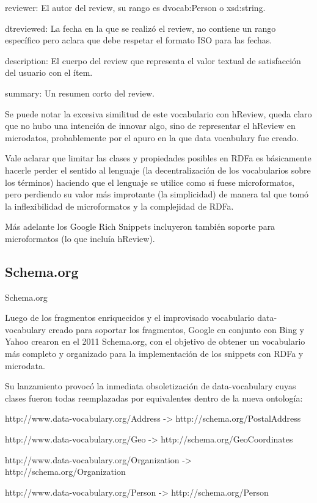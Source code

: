 reviewer: El autor del review, su rango es dvocab:Person o xsd:string.

dtreviewed: La fecha en la que se realizó el review, no contiene un rango específico pero aclara que debe respetar el formato 
ISO para las fechas.

description: El cuerpo del review que representa el valor textual de satisfacción del usuario con el ítem.

summary: Un resumen corto del review.

Se puede notar la excesiva similitud de este vocabulario con hReview, queda claro que no hubo una intención de innovar algo, 
sino de representar el hReview en microdatos, probablemente por el apuro en la que data vocabulary fue creado.

Vale aclarar que limitar las clases y propiedades posibles en RDFa es básicamente hacerle perder el sentido al lenguaje 
(la decentralización de los vocabularios sobre los términos) haciendo que el lenguaje se utilice como si fuese microformatos, 
pero perdiendo su valor más improtante (la simplicidad) de manera tal que tomó la inflexibilidad de microformatos y la complejidad 
de RDFa.

Más adelante los Google Rich Snippets incluyeron también soporte para microformatos (lo que incluía hReview). 


\subsection{Schema.org}
Schema.org

Luego de los fragmentos enriquecidos y el improvisado vocabulario data-vocabulary creado para soportar los fragmentos, Google 
en conjunto con Bing y Yahoo crearon en el 2011 Schema.org, con el objetivo de obtener un vocabulario más completo y 
organizado para la implementación de los snippets con RDFa y microdata.

Su lanzamiento provocó la inmediata obsoletización de data-vocabulary cuyas clases fueron todas reemplazadas por equivalentes 
dentro de la nueva ontología:

http://www.data-vocabulary.org/Address -> http://schema.org/PostalAddress

http://www.data-vocabulary.org/Geo -> http://schema.org/GeoCoordinates

http://www.data-vocabulary.org/Organization -> http://schema.org/Organization

http://www.data-vocabulary.org/Person -> http://schema.org/Person

